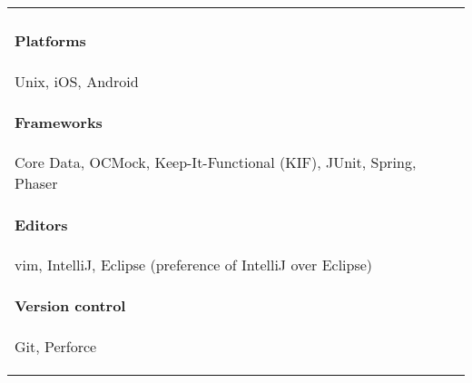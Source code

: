 \documentclass[letterpaper,10pt]{article} %
\begin{document}
\begin{tabular}{ll}
\begin{minipage}[t]{3.75in}
        \paragraph{Platforms} Unix, iOS, Android
        \paragraph{Frameworks} Core Data, OCMock, Keep-It-Functional (KIF), JUnit, {\footnotesize Spring, Phaser}
        \paragraph{Editors} vim, IntelliJ, Eclipse {\footnotesize (preference of IntelliJ over Eclipse)}
        \paragraph{Version control} Git, Perforce
    \end{minipage}
\end{tabular}
\end{document}
